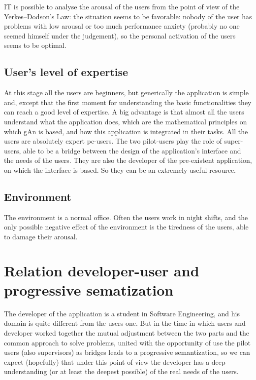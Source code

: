 IT is possible to analyse the arousal of the users from the point of view of the Yerkes–Dodson's Law: the situation seems to be favorable: nobody of the user 
has problems with low arousal or too much performance anxiety (probably no one seemed himself under the judgement), so the personal activation of the users seems to be optimal.

\subsection{User's level of expertise }
At this stage all the users are beginners, but generically the application is simple and, except that the first moment for understanding the basic functionalities they can reach a good level of expertise. A big advantage is that almost all the users understand what the application does, which are the mathematical principles on which gAn is based, and how this application is integrated in their tasks.   
All the users are absolutely expert pc-users.
The two pilot-users play the role of super-users, able to be a bridge between the design of the application's interface and the needs of the users. They are also the developer of the pre-existent application, on which the interface is based. So they can be an extremely useful resource.  


\subsection{Environment}
The environment is a normal office. Often the users work in night shifts, and the only possible negative effect of the environment is the tiredness of the users, able to damage their arousal. 

\section{Relation developer-user and progressive sematization}
The developer of the application is a student in Software Engineering, and his domain is quite different from the users one. But in the time in which users and developer worked together the mutual adjustment between the two parts and the common approach to solve problems, united with the opportunity of use the pilot users (also supervisors) as bridges leads to a progressive semantization, so we can expect (hopefully) that under this point of view the developer has a deep understanding (or at least the deepest possible) of the real needs of the users.

